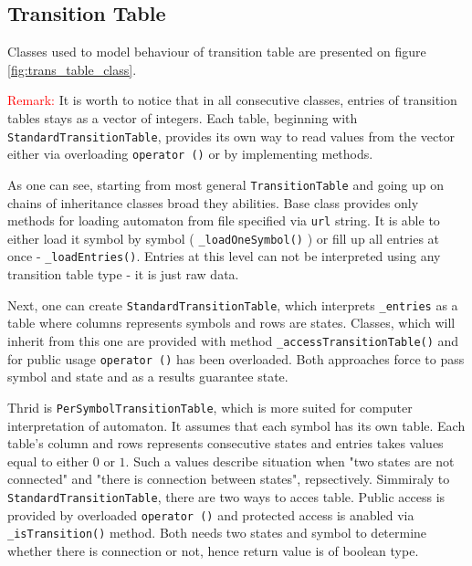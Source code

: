 \documentclass{article}
\begin{document}
%
%
\newpage
\subsection{Transition Table} \label{subsec:transition_table}
Classes used to model behaviour of transition table are presented on figure \ref{fig:trans_table_class}. 

\textcolor{red}{Remark:} It is worth to notice that in all consecutive classes, entries of transition tables stays as a vector of integers. Each table, beginning with \texttt{StandardTransitionTable}, provides its own way to read values from the vector either via overloading \texttt{operator ()} or by implementing methods.

As one can see, starting from most general \texttt{TransitionTable} and going up on chains of inheritance classes broad they abilities. Base class provides only methods for loading automaton from file specified via \texttt{url} string. It is able to either load it symbol by symbol ( \texttt{\_loadOneSymbol()} ) or fill up all entries at once - \texttt{\_loadEntries()}. Entries at this level can not be interpreted using any transition table type - it is just raw data.

Next, one can create \texttt{StandardTransitionTable}, which interprets \texttt{\_entries} as a table where columns represents symbols and rows are states. Classes, which will inherit from this one are provided with method \texttt{\_accessTransitionTable()} and for public usage \texttt{operator ()} has been overloaded. Both approaches force to pass symbol and state and as a results guarantee state. 

Thrid  is \texttt{PerSymbolTransitionTable}, which is more suited for computer interpretation of automaton. It assumes that each symbol has its own table. Each table's column and rows represents consecutive states and entries takes values equal to either $0$ or $1$. Such a values describe situation when "two states are not connected" and "there is connection between states", repsectively. Simmiraly to \texttt{StandardTransitionTable}, there are two ways to acces table. Public access is provided by overloaded \texttt{operator ()} and protected access is anabled via \texttt{\_isTransition()} method. Both needs two states and symbol to determine whether there is connection or not, hence return value is of boolean type.
\end{document}
